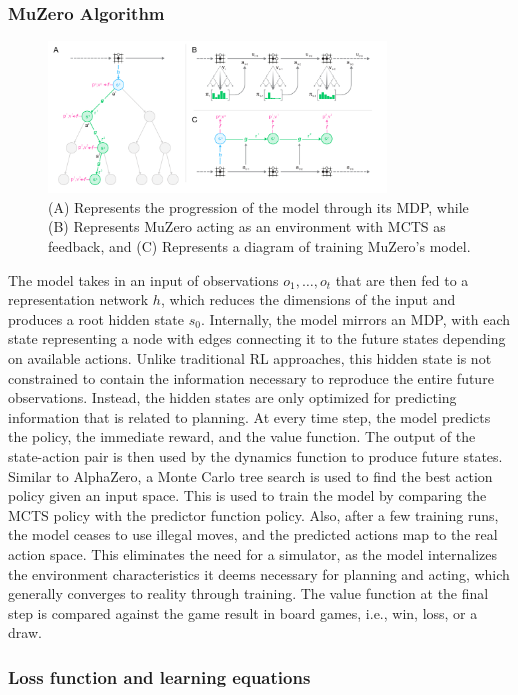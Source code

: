 \subsubsection{MuZero Algorithm}
\begin{figure}[t]
    \centering
    \includegraphics[width=0.8\textwidth]{sections/7MuZero/graph_1.png}
    \caption{(A) Represents the progression of the model through its MDP, while (B) Represents MuZero acting as an environment with MCTS as feedback, and (C) Represents a diagram of training MuZero's model.}
\end{figure}
The model takes in an input of observations $o_1, \ldots, o_t$ that are then fed to a representation network $h$,
which reduces the dimensions of the input and produces a root hidden state $s_0$. Internally, the model
mirrors an MDP, with each state representing a node with edges connecting it to the future states
depending on available actions. Unlike traditional RL approaches, this hidden state is not constrained to
contain the information necessary to reproduce the entire future observations. Instead, the hidden states
are only optimized for predicting information that is related to planning. At every time step, the model
predicts the policy, the immediate reward, and the value function. The output of the state-action pair is
then used by the dynamics function to produce future states. Similar to AlphaZero, a Monte Carlo tree
search is used to find the best action policy given an input space. This is used to train the model by
comparing the MCTS policy with the predictor function policy. Also, after a few training runs, the model
ceases to use illegal moves, and the predicted actions map to the real action space. This eliminates the
need for a simulator, as the model internalizes the environment characteristics it deems necessary for
planning and acting, which generally converges to reality through training. The value function at
the final step is compared against the game result in board games, i.e., win, loss, or a draw.

\subsubsection{Loss function and learning equations}


